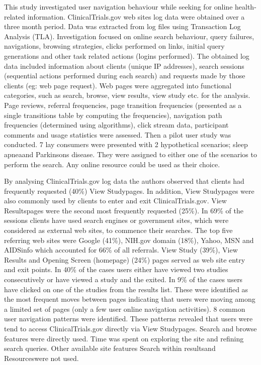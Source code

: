 \documentclass[]{article}
\begin{document}
\begin{enumerate}
This study investigated user navigation behaviour while seeking for online health-related information. ClinicalTrials.gov web site\textquotesingle s log data were obtained over a three month period. Data was extracted from log files using Transaction Log Analysis (TLA). Investigation focused on online search behaviour, query failures, navigations, browsing strategies, clicks performed on links, initial query generations and other task related actions (logins performed). The obtained log data included information about clients (unique IP addresses), search sessions (sequential actions performed during each search) and requests made by those clients (eg: web page request). Web pages were aggregated into functional categories, such as search, browse, view results, view study etc. for the analysis. Page reviews, referral frequencies, page transition frequencies (presented as a single transitions table by computing the frequencies), navigation path frequencies (determined using algorithms), click stream data, participant comments and usage statistics were assessed. Then a pilot user study was conducted. 7 lay consumers were presented with 2 hypothetical scenarios; \textquotesingle sleep apnea\textquotesingle and \textquotesingle Parkinson\textquotesingle s disease\textquotesingle. They were assigned to either one of the scenarios to perform the search. Any online resource could be used as their choice. 

By analysing ClinicalTrials.gov log data the authors observed that clients had frequently requested (40\%) \textquotesingle View Study\textquotesingle  pages. In addition, \textquotesingle View Study\textquotesingle  pages were also commonly used by clients to enter and exit ClinicalTrials.gov. \textquotesingle View Results\textquotesingle  pages were the second most frequently requested (25\%). In 69\% of the sessions clients have used search engines or government sites, which were considered as external web sites, to commence their searches. The top five referring web sites were Google (41\%), NIH.gov domain (18\%), Yahoo, MSN and AIDSinfo which accounted for 66\% of all referrals. View Study (39\%), View Results and Opening Screen (homepage)  (24\%) pages served as web site entry and exit points. In 40\% of the cases users either have viewed two studies consecutively or have viewed a study and the exited. In 9\% of the cases users have clicked on one of the studies from the results list. These were identified as the most frequent moves between pages indicating that users were moving among a limited set of pages (only a few user online navigation activities). 8 common user navigation patterns were identified. These patterns revealed that users were tend to access ClinicalTrials.gov directly via \textquotesingle View Study\textquotesingle  pages. Search and browse features were directly used. Time was spent on exploring the site and refining search queries. Other available site features \textquotesingle Search within results\textquotesingle  and \textquotesingle Resources\textquotesingle  were not used.


\end{enumerate}
\end{document}
